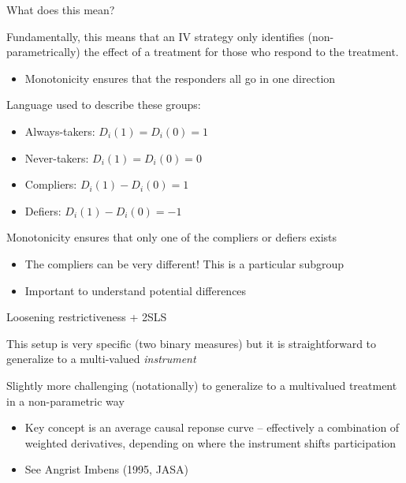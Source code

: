 \documentclass[notes,11pt, aspectratio=169]{beamer}
\newenvironment{wideitemize}{\itemize\addtolength{\itemsep}{10pt}}{\enditemize}
\begin{document}
\begin{frame}{What does this mean?}
  \begin{wideitemize}
  \item Fundamentally, this means that an IV strategy only identifies
    (non-parametrically) the effect of a treatment for those who
    respond to the treatment.
    \begin{itemize}
    \item     Monotonicity ensures that the responders all go in one direction
    \end{itemize}
  \item Language used to describe these groups:
    \begin{itemize}
    \item Always-takers: $D_{i}(1) = D_{i}(0) = 1$
    \item Never-takers: $D_{i}(1) = D_{i}(0) = 0$
    \item Compliers: $D_{i}(1) - D_{i}(0) = 1$
    \item Defiers: $D_{i}(1) - D_{i}(0) = -1$                   
    \end{itemize}
  \item Monotonicity ensures that only one of the compliers or defiers exists
    \begin{itemize}
    \item The compliers can be very different! This is a particular subgroup
    \item Important to understand potential differences
    \end{itemize}
  \end{wideitemize}
\end{frame}

\begin{frame}{Loosening restrictiveness + 2SLS}
  \begin{wideitemize}
  \item This setup is very specific (two binary measures) but it is
    straightforward to generalize to a multi-valued \emph{instrument}
  \item Slightly more challenging (notationally) to generalize to a multivalued
    treatment in a non-parametric way
    \begin{itemize}
    \item Key concept is an average causal reponse curve --
      effectively a combination of weighted derivatives, depending on
      where the instrument shifts participation
    \item See Angrist Imbens (1995, JASA)
    \end{itemize}
  \end{wideitemize}
\end{frame}
\end{document}
